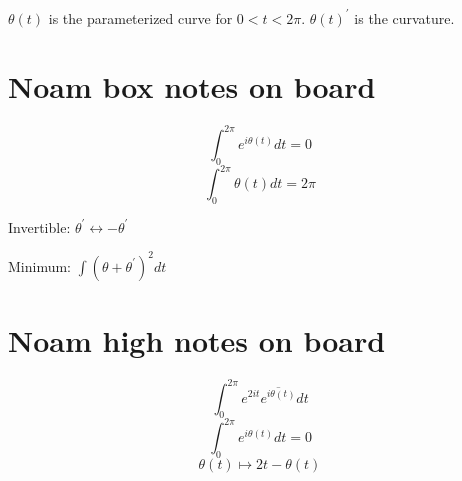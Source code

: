 \documentclass{article}
\begin{document}
    
$\theta(t)$ is the parameterized curve for $0<t<2\pi$.
$\theta(t)^{\prime}$ is the curvature.
    \section{Noam box notes on board}
    \[ \int_0^{2\pi} e^{i\theta(t)}dt = 0\]
    \[ \int_0^{2\pi} \theta(t)dt = 2\pi\]

    Invertible: $\theta^\prime \leftrightarrow -\theta^\prime$

    Minimum: $\int (\theta+\theta^\prime)^2 dt$

    \section{Noam high notes on board}
    \[ \int_0^{2\pi} e^{2it}\overline{e^{i\theta(t)}}dt\]
    \[ \int_0^{2\pi} e^{i\theta(t)}dt = 0\]
\[\theta(t)\mapsto 2t-\theta(t)\]
\end{document}
